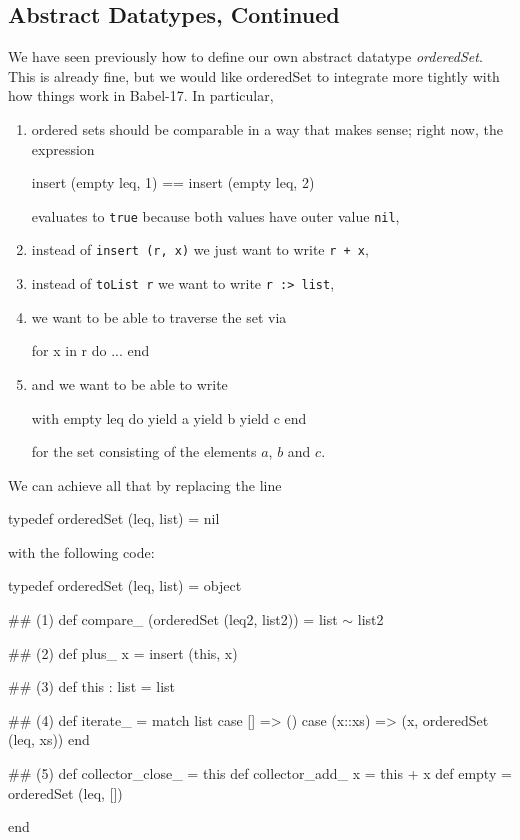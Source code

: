 \documentclass[11pt]{amsart}
\newcommand{\babelsrc}[1] {\lstinline!#1!}
\begin{document}
\subsection{Abstract Datatypes, Continued}
We have seen previously how to define our own abstract datatype \emph{orderedSet}. This is already fine, but we would like orderedSet to integrate more tightly with how things work in Babel-17. In particular,
\begin{enumerate}
\item ordered sets should be comparable in a way that makes sense; right now, the expression
\begin{babellisting}
insert (empty leq, 1) == insert (empty leq, 2)
\end{babellisting}
evaluates to \babelsrc{true} because both values have outer value \babelsrc{nil},
\item instead of \babelsrc{insert (r, x)} we just want to write \babelsrc{r + x},
\item instead of \babelsrc{toList r} we want to write \babelsrc{r :> list},
\item we want to be able to traverse the set via
\begin{babellisting}
for x in r do ... end
\end{babellisting}
\item and we want to be able to write 
\begin{babellisting}
with empty leq do
  yield a
  yield b
  yield c
end
\end{babellisting}
for the set consisting of the elements $a$, $b$ and $c$.
\end{enumerate}
We can achieve all that by replacing the line 
\begin{babellisting}
typedef orderedSet (leq, list) = nil
\end{babellisting}
with the following code:
\begin{babellisting}
typedef orderedSet (leq, list) = 
  object

    ## (1)
    def compare_ (orderedSet (leq2, list2)) = list $\sim$ list2

    ## (2)
    def plus_ x = insert (this, x)

    ## (3)
    def this : list = list

    ## (4)
    def iterate_ =
        match list
            case [] => ()
            case (x::xs) => (x, orderedSet (leq, xs))
        end

    ## (5)
    def collector_close_ = this
    def collector_add_ x = this + x
    def empty = orderedSet (leq, [])

  end
\end{babellisting}
\end{document}
